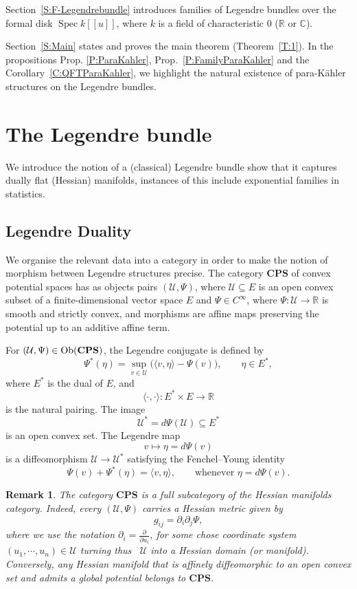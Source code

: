 \documentclass[12pt]{amsart}
\newtheorem{remark}{Remark}
\begin{document}
Section~\ref{S:F-Legendrebundle} introduces families of Legendre bundles over the formal disk $\operatorname{Spec} k[[u]]$, where $k$ is a field of characteristic 0 ($\mathbb{R}$ or $\mathbb{C}$).

Section~\ref{S:Main} states and proves the main theorem (Theorem~\ref{T:1}). In the propositions Prop. \ref{P:ParaKahler}, Prop.~\ref{P:FamilyParaKahler} and the Corollary~\ref{C:QFTParaKahler}, we highlight the natural existence of para-K\"ahler structures on the Legendre bundles.

\section{The Legendre bundle}\label{S:LegendreBundle}
We introduce the notion of a (classical) Legendre bundle show that it captures dually flat (Hessian) manifolds, instances of this include exponential families in statistics.
\subsection{Legendre Duality}

We organise the relevant data into a category in order to make the notion of morphism between Legendre structures precise. The category $\mathbf{CPS}$ of convex potential spaces has as objects pairs $(\mathcal{U}, \Psi)$, where $\mathcal{U} \subseteq E$ is an open convex subset of a finite-dimensional vector space $E$ and $\Psi \in C^{\infty}$, where $\Psi : \mathcal{U} \to \mathbb{R} $
is smooth and strictly convex, and morphisms are affine maps preserving the potential up to an additive affine term.

\smallskip 

For $(\mathcal{U}, \Psi) \in \rm Ob(\mathbf{CPS})$, the Legendre conjugate is defined by
\[
\Psi^*(\eta) = \sup_{v \in \mathcal{U}} \bigl( \langle v, \eta \rangle - \Psi(v) \bigr), 
\qquad \eta \in E^*,
\]
where $E^*$ is the dual of $E$, and 
\[
\langle \cdot, \cdot \rangle : E^* \times E \to \mathbb{R}
\]
is the natural pairing. The image
\[
\mathcal{U}^* = d\Psi(\mathcal{U}) \subseteq E^*
\]
is an open convex set. The Legendre map
\[
v \mapsto \eta = d\Psi(v)
\]
is a diffeomorphism $\mathcal{U} \to \mathcal{U}^*$ satisfying the Fenchel--Young identity
\[
\Psi(v) + \Psi^*(\eta) = \langle v, \eta \rangle, 
\qquad \text{whenever } \eta = d\Psi(v).
\]

\begin{remark}
The category $\mathbf{CPS}$ is a full subcategory of the Hessian manifolds category. Indeed, every $(\mathcal{U}, \Psi)$ carries a Hessian metric given by
\[
g_{ij} = \partial_i \partial_j \Psi,
\] where we use the notation $\partial_i=\frac{\partial}{\partial u_i}$, for some chose coordinate system $(u_1,\cdots,u_n)\in \mathcal{U}$ turning thus \,  $\mathcal{U}$ into a Hessian domain (or manifold). Conversely, any Hessian manifold that is affinely diffeomorphic to an open convex set and admits a global potential belongs to $\mathbf{CPS}$.
\end{remark}
\end{document}
